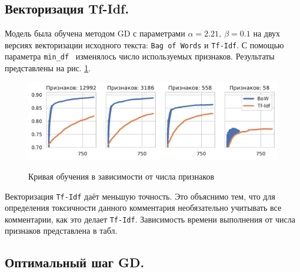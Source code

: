 \documentclass[12pt]{extarticle}
\begin{document}
\subsection{Векторизация Tf-Idf.}

Модель была обучена методом GD с параметрами $\alpha=2.21,\ \beta=0.1$ на двух версиях векторизации исходного текста: \texttt{Bag of Words} и \texttt{Tf-Idf}. С помощью параметра \texttt{min\_df}~\cite{mindf} изменялось число используемых признаков. Результаты представлены на рис. \ref{fig:tfidf_bow}. 

\begin{figure}[!htb]
    \centering
    \caption{Кривая обучения в зависимости от числа признаков}
    \includegraphics[width=0.85\linewidth]{pics/tfidf_bow.pdf}
    \label{fig:tfidf_bow}
\end{figure}

Векторизация \texttt{Tf-Idf} даёт меньшую точность. Это объяснимо тем, что для определения токсичности данного комментария необязательно учитывать все комментарии, как это делает \texttt{Tf-Idf}. Зависимость времени выполнения от числа признаков представлена в табл.

\subsection{Оптимальный шаг GD.}
\end{document}

